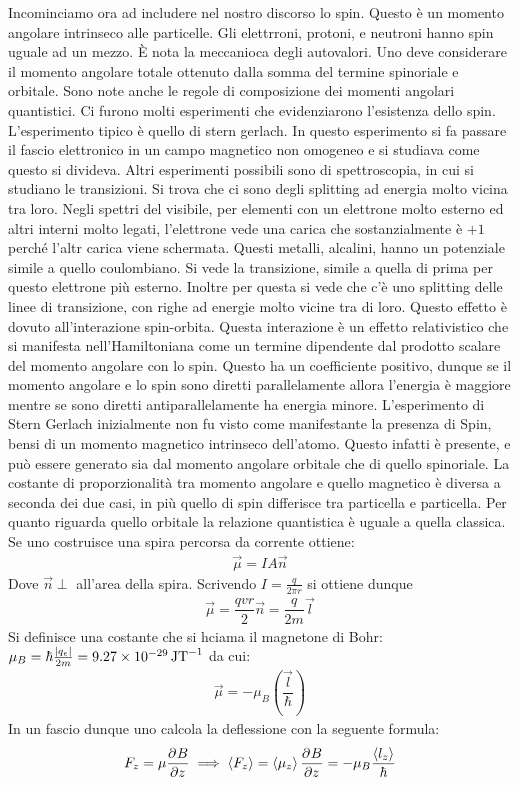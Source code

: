 \documentclass[10pt, a4paper]{article}
\begin{document}
	Incominciamo ora ad includere nel nostro discorso lo spin. Questo è un momento angolare intrinseco alle particelle. Gli elettrroni, protoni, e neutroni hanno spin uguale ad un mezzo. È nota la meccanioca degli autovalori. Uno deve considerare il momento angolare totale ottenuto dalla somma del termine spinoriale e orbitale. Sono note anche le regole di composizione dei momenti angolari quantistici. Ci furono molti esperimenti che evidenziarono l'esistenza dello spin. L'esperimento tipico è quello di stern gerlach. In questo esperimento si fa passare il fascio elettronico in un campo magnetico non omogeneo e si studiava come questo si divideva. Altri esperimenti possibili sono di spettroscopia, in cui si studiano le transizioni. Si trova che ci sono degli splitting ad energia molto vicina tra loro. Negli spettri del visibile, per elementi con un elettrone molto esterno ed altri interni molto legati, l'elettrone vede una carica che sostanzialmente è $ +1 $ perché l'altr carica viene schermata. Questi metalli, alcalini, hanno un potenziale simile a quello coulombiano. Si vede la transizione, simile a quella di prima per questo elettrone più esterno. Inoltre per questa si vede che c'è uno splitting delle linee di transizione, con righe ad energie molto vicine tra di loro. Questo effetto è dovuto all'interazione spin-orbita. Questa interazione è un effetto relativistico che si manifesta nell'Hamiltoniana come un termine dipendente dal prodotto scalare del momento angolare con lo spin. Questo ha un coefficiente positivo, dunque se il momento angolare e lo spin sono diretti parallelamente allora l'energia è maggiore mentre se sono diretti antiparallelamente ha energia minore.  
	L'esperimento di Stern Gerlach inizialmente non fu visto come manifestante la presenza di Spin, bensi di un momento magnetico intrinseco dell'atomo. Questo infatti è presente, e può essere generato sia dal momento angolare orbitale che di quello spinoriale. La costante di proporzionalità tra momento angolare e quello magnetico è diversa a seconda dei due casi, in più quello di spin differisce tra particella e particella. Per quanto riguarda quello orbitale la relazione quantistica è uguale a quella classica. Se uno costruisce una spira percorsa da corrente ottiene:
	\begin{gather*}
		\vec{\mu}=IA\vec{n}
	\end{gather*}
	Dove $ \vec{n}\perp $ all'area della spira. Scrivendo $ I=\frac{q}{2\pi r} $ si ottiene dunque
	\begin{gather*}
		\vec{\mu}=\dfrac{qvr}{2}\vec{n}=\dfrac{q}{2m}\vec{l}
	\end{gather*}
	Si definisce una costante che si hciama il magnetone di Bohr: $ \mu_{B}=\hbar\frac{\abs{q_{e}}}{2m}=\SI{9.27e-29}{\joule\tesla^{-1}} $
	da cui:
	\begin{gather*}
	\vec{\mu}=-\mu_{B}\left(\dfrac{\vec{l}}{\hbar}\right)
	\end{gather*}
	In un fascio dunque uno calcola la deflessione con la seguente formula:
	\begin{gather*}
	F_{z}=\mu\derp[]{B}{z} \implies \expval{F_{z}}=\expval{\mu_{z}}\derp[]{B}{z}=-\mu_{B}\dfrac{\expval{l_{z}}}{\hbar}
	\end{gather*}
\end{document}
